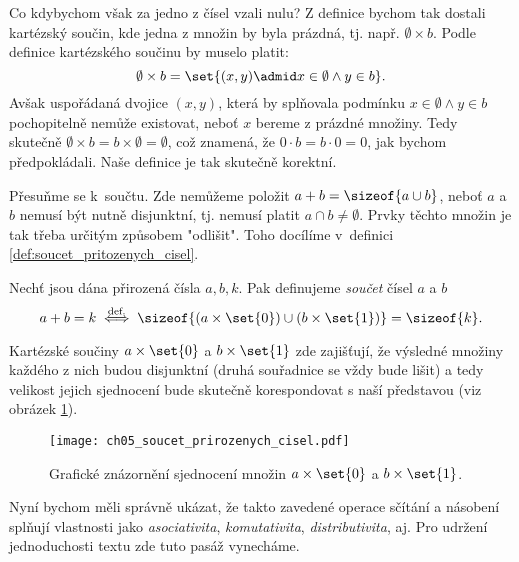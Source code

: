 Co kdybychom však za jedno z čísel vzali nulu? Z definice bychom tak dostali kartézský součin, kde jedna z množin by byla prázdná, tj. např. $\emptyset\times b$. Podle definice kartézského součinu by muselo platit:
\begin{equation*}
    \emptyset\times b=\set{(x,y) \admid x\in\emptyset \land y\in b}.
\end{equation*}
Avšak uspořádaná dvojice $(x,y)$, která by splňovala podmínku $x\in\emptyset \land y\in b$ pochopitelně nemůže existovat, neboť $x$ bereme z prázdné množiny. Tedy skutečně $\emptyset\times b=b\times\emptyset=\emptyset$, což znamená, že $0\cdot b=b\cdot 0=0$, jak bychom předpokládali. Naše definice je tak skutečně korektní.\par
Přesuňme se k~součtu. Zde nemůžeme položit $a+b=\sizeof{a\cup b}$, neboť $a$ a $b$ nemusí být nutně disjunktní, tj. nemusí platit $a\cap b\neq\emptyset$. Prvky těchto množin je tak třeba určitým způsobem "odlišit". Toho docílíme v~definici \ref{def:soucet_pritozenych_cisel}.
\begin{definition}\label{def:soucet_pritozenych_cisel}
    Nechť jsou dána přirozená čísla $a,b,k$. Pak definujeme \emph{součet} čísel $a$ a $b$
    \begin{equation*}
        a+b=k\stackrel{\text{def.}}{\iff} \sizeof{(a\times\set{0})\cup (b\times\set{1})}=\sizeof{k}.
    \end{equation*}
\end{definition}
Kartézské součiny $a\times\set{0}$ a $b\times\set{1}$ zde zajišťují, že výsledné množiny každého z nich budou disjunktní (druhá souřadnice se vždy bude lišit) a tedy velikost jejich sjednocení bude skutečně korespondovat s naší představou (viz obrázek \ref{fig:soucet_prirozenych_cisel}).
\begin{figure}[H]
	\centering
	\texttt{[image: ch05\_soucet\_prirozenych\_cisel.pdf]}
    \caption{Grafické znázornění sjednocení množin $a\times\set{0}$ a $b\times\set{1}$.}
    \label{fig:soucet_prirozenych_cisel}
\end{figure}
Nyní bychom měli správně ukázat, že takto zavedené operace sčítání a násobení splňují vlastnosti jako \emph{asociativita}, \emph{komutativita}, \emph{distributivita}, aj. Pro udržení jednoduchosti textu zde tuto pasáž vynecháme.